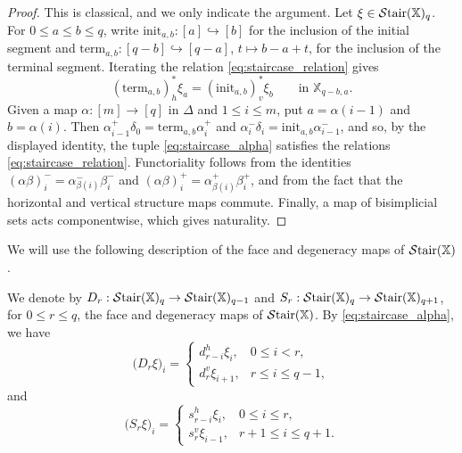\documentclass[10pt,reqno]{amsart}
\begin{document}
\begin{proof}
This is classical, and we only indicate the argument. Let
$\xi\in\mathcal{S}\mathrm{tair}(\mathbb X)_q$. For $0\leq a\leq b\leq q$, write
$\mathrm{init}_{a,b}:[a]\hookrightarrow[b]$ for the inclusion of the
initial segment and
$\mathrm{term}_{a,b}:[q-b]\hookrightarrow[q-a]$, $t\mapsto b-a+t$,
for the inclusion of the terminal segment. Iterating the relation
\eqref{eq:staircase_relation} gives
\[
(\mathrm{term}_{a,b})_h^*\xi_a=(\mathrm{init}_{a,b})_v^*\xi_b
\qquad\text{in }\mathbb X_{q-b,a}.
\]
Given a map $\alpha:[m]\to[q]$ in $\Delta$ and $1\leq i\leq m$,
put $a=\alpha(i-1)$ and $b=\alpha(i)$. Then
$\alpha_{i-1}^+\delta_0=\mathrm{term}_{a,b}\alpha_i^+$ and
$\alpha_i^-\delta_i=\mathrm{init}_{a,b}\alpha_{i-1}^-$, and so, by
the displayed identity, the tuple \eqref{eq:staircase_alpha} satisfies
the relations \eqref{eq:staircase_relation}. Functoriality follows
from the identities
$(\alpha\beta)_i^-=\alpha_{\beta(i)}^-\beta_i^-$ and
$(\alpha\beta)_i^+=\alpha_{\beta(i)}^+\beta_i^+$, and from the fact
that the horizontal and vertical structure maps commute. Finally, a
map of bisimplicial sets acts componentwise, which gives naturality.
\end{proof}

We will use the following description of the face and degeneracy maps
of $\mathcal{S}\mathrm{tair}(\mathbb X)$.

\begin{rmk}
\label{rem:staircase_faces_degeneracies}
We denote by $D_r:\mathcal{S}\mathrm{tair}(\mathbb X)_q\to\mathcal{S}\mathrm{tair}(\mathbb X)_{q-1}$
and $S_r:\mathcal{S}\mathrm{tair}(\mathbb X)_q\to\mathcal{S}\mathrm{tair}(\mathbb X)_{q+1}$, for
$0\leq r\leq q$, the face and degeneracy maps of
$\mathcal{S}\mathrm{tair}(\mathbb X)$. By \eqref{eq:staircase_alpha}, we have
\begin{equation}\label{eq:staircase_faces}
\bigl(D_r\xi\bigr)_i
=
\begin{cases}
d_{r-i}^h \xi_i, & 0\leq i<r,\\[1mm]
d_r^v \xi_{i+1}, & r\leq i\leq q-1,
\end{cases}
\end{equation}
and
\begin{equation}\label{eq:staircase_degeneracies}
\bigl(S_r\xi\bigr)_i
=
\begin{cases}
s_{r-i}^h \xi_i, & 0\leq i\leq r,\\[1mm]
s_r^v \xi_{i-1}, & r+1\leq i\leq q+1.
\end{cases}
\end{equation}
\end{rmk}
\end{document}
